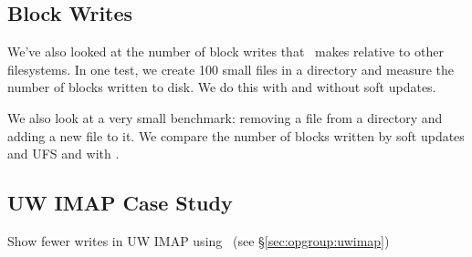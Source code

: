 \subsection {Block Writes}
We've also looked at the number of block writes that \Kudos\ makes
relative to other filesystems. In one test, we create 100 small files
in a directory and measure the number of blocks written to disk. We do
this with and without soft updates.

We also look at a very small benchmark: removing a file from a
directory and adding a new file to it. We compare the number of blocks
written by soft updates and UFS and with \Kudos.

\subsection {UW IMAP Case Study}
\label{sec:evaluation:uwimap}

Show fewer writes in UW IMAP using \opgroups\ (see \S\ref{sec:opgroup:uwimap})
